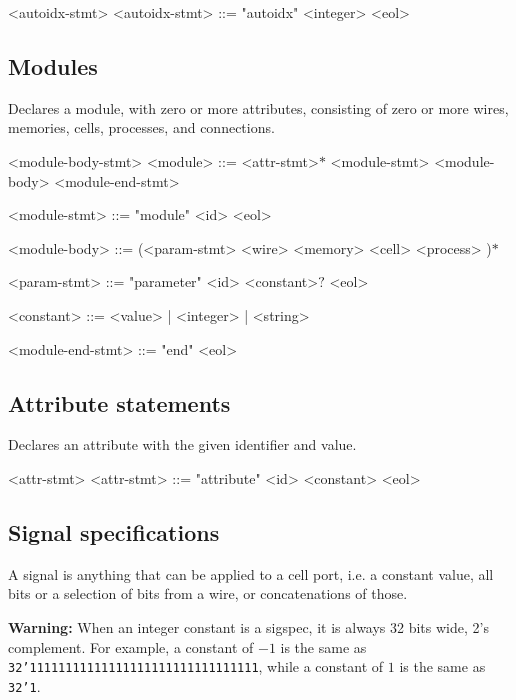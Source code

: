 \begin{indentgrammar}{<autoidx-stmt>}
<autoidx-stmt> ::= "autoidx" <integer> <eol>
\end{indentgrammar}

\subsection{Modules}

Declares a module, with zero or more attributes, consisting of zero or more wires, memories, cells, processes, and connections.

\begin{indentgrammar}{<module-body-stmt>}
<module> ::= <attr-stmt>$*$ <module-stmt> <module-body> <module-end-stmt>

<module-stmt> ::= "module" <id> <eol>

<module-body> ::= 
(<param-stmt>
  \alt <wire>
  \alt <memory>
  \alt <cell>
  \alt <process>
  )$*$

<param-stmt> ::= "parameter" <id> <constant>$?$ <eol>

<constant> ::= <value> | <integer> | <string>

<module-end-stmt> ::= "end" <eol>
\end{indentgrammar}

\subsection{Attribute statements}

Declares an attribute with the given identifier and value.

\begin{indentgrammar}{<attr-stmt>}
<attr-stmt> ::= "attribute" <id> <constant> <eol>
\end{indentgrammar}

\subsection{Signal specifications}

A signal is anything that can be applied to a cell port, i.e. a constant value, all bits or a selection of bits from a wire, or concatenations of those.

\textbf{Warning:} When an integer constant is a sigspec, it is always 32 bits wide, 2's complement. For example, a constant of $-1$ is the same as \texttt{32'11111111111111111111111111111111}, while a constant of $1$ is the same as \texttt{32'1}.

